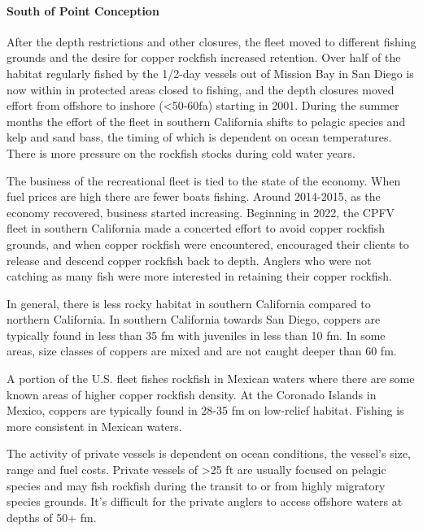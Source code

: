\documentclass[11pt,
  english,
  letterpaper,
]{article}
\begin{document}
\hypertarget{south-of-point-conception}{%
\paragraph{South of Point Conception}\label{south-of-point-conception}}

After the depth restrictions and other closures, the fleet moved to different fishing grounds and the desire for copper rockfish increased retention. Over half of the habitat regularly fished by the 1/2-day vessels out of Mission Bay in San Diego is now within in protected areas closed to fishing, and the depth closures moved effort from offshore to inshore (\textless50-60fa) starting in 2001. During the summer months the effort of the fleet in southern California shifts to pelagic species and kelp and sand bass, the timing of which is dependent on ocean temperatures. There is more pressure on the rockfish stocks during cold water years.

The business of the recreational fleet is tied to the state of the economy. When fuel prices are high there are fewer boats fishing. Around 2014-2015, as the economy recovered, business started increasing. Beginning in 2022, the CPFV fleet in southern California made a concerted effort to avoid copper rockfish grounds, and when copper rockfish were encountered, encouraged their clients to release and descend copper rockfish back to depth. Anglers who were not catching as many fish were more interested in retaining their copper rockfish.

In general, there is less rocky habitat in southern California compared to northern California. In southern California towards San Diego, coppers are typically found in less than 35 fm with juveniles in less than 10 fm. In some areas, size classes of coppers are mixed and are not caught deeper than 60 fm.

A portion of the U.S. fleet fishes rockfish in Mexican waters where there are some known areas of higher copper rockfish density. At the Coronado Islands in Mexico, coppers are typically found in 28-35 fm on low-relief habitat. Fishing is more consistent in Mexican waters.

The activity of private vessels is dependent on ocean conditions, the vessel's size, range and fuel costs. Private vessels of \textgreater25 ft are usually focused on pelagic species and may fish rockfish during the transit to or from highly migratory species grounds. It's difficult for the private anglers to access offshore waters at depths of 50+ fm.
\end{document}
